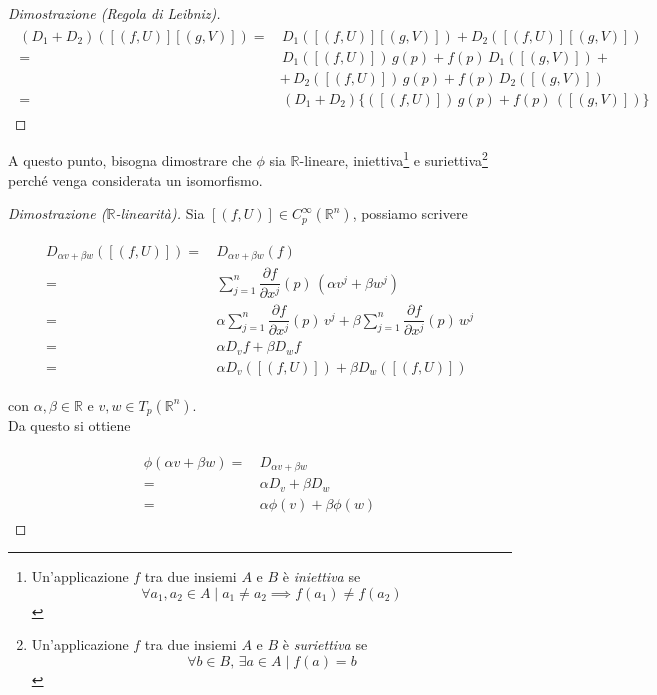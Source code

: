 \begin{proof}[Dimostrazione (Regola di Leibniz)]
	\begin{align}
		\begin{split}
			(D_{1} + D_{2}) ([(f,U)] [(g,V)]) =& \, D_{1} ([(f,U)] [(g,V)]) + D_{2} ([(f,U)] [(g,V)])\\
			=& \, D_{1} ([(f,U)]) \, g(p) + f(p) \, D_{1} ([(g,V)]) +\\
			&+ \, D_{2} ([(f,U)]) \, g(p) + f(p) \, D_{2} ([(g,V)])\\
			=& \, (D_{1} + D_{2}) \{ ([(f,U)]) \, g(p) + f(p) \, ([(g,V)]) \}
		\end{split}
	\end{align}
\end{proof}

A questo punto, bisogna dimostrare che $ \phi $ sia $ \mathbb{R} $-lineare, iniettiva\footnote{%
	Un'applicazione $ f $ tra due insiemi $ A $ e $ B $ è \textit{iniettiva} se
	\begin{equation}
		\forall a_{1},a_{2} \in A \mid a_{1} \neq a_{2} \implies f(a_{1}) \neq f(a_{2})
	\end{equation}%
} e suriettiva\footnote{%
	Un'applicazione $ f $ tra due insiemi $ A $ e $ B $ è \textit{suriettiva} se
	\begin{equation}
		\forall b \in B, \, \exists a \in A \mid f(a) = b
	\end{equation}%
} perché venga considerata un isomorfismo.

\begin{proof}[Dimostrazione ($ \mathbb{R} $-linearità)]
	Sia $ [(f,U)] \in C_{p}^{\infty}(\mathbb{R}^{n}) $, possiamo scrivere
	
	\begin{align}
		\begin{split}
			D_{\alpha v + \beta w} ([(f,U)]) =& \, D_{\alpha v + \beta w} (f)\\
			=& \, \sum_{j=1}^{n} \dfrac{\partial f}{\partial x^{j}} (p) \, (\alpha v^{j} + \beta w^{j})\\
			=& \, \alpha \sum_{j=1}^{n} \dfrac{\partial f}{\partial x^{j}} (p) \, v^{j} + \beta \sum_{j=1}^{n} \dfrac{\partial f}{\partial x^{j}} (p) \, w^{j}\\
			=& \, \alpha D_{v} f + \beta D_{w} f\\
			=& \, \alpha D_{v} ([(f,U)]) + \beta D_{w} ([(f,U)])
		\end{split}
	\end{align}

	con $ \alpha,\beta \in \mathbb{R} $ e $ v,w \in T_{p}(\mathbb{R}^{n}) $.\\
	Da questo si ottiene
	
	\begin{align}
		\begin{split}
			\phi (\alpha v + \beta w) =& \, D_{\alpha v + \beta w}\\
			=& \, \alpha D_{v} + \beta D_{w}\\
			=& \, \alpha \phi (v) + \beta \phi (w)
		\end{split}
	\end{align}
\end{proof}

